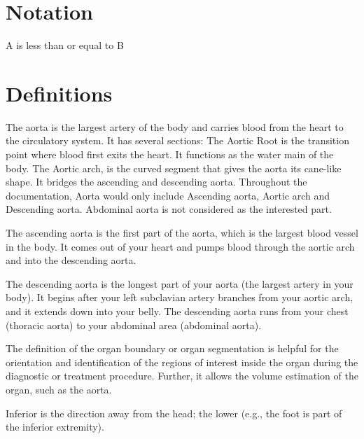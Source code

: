
\section*{Notation}
\begin{description}[font=\rmfamily\bfseries, leftmargin=3cm, style=nextline]
	\item[$A \leq B$] A is less than or equal to B
\end{description}

\section*{Definitions}
\begin{description}[font=\rmfamily\bfseries, leftmargin=3cm, style=nextline]
	\item[Aorta] The aorta is the largest artery of the body and carries blood from the heart to the circulatory system. It has several sections: The Aortic Root is the transition point where blood first exits the heart. It functions as the water main of the body. The Aortic arch, is the curved segment that gives the aorta its cane-like shape. It bridges the ascending and descending aorta. Throughout the documentation, Aorta would only include Ascending aorta, Aortic arch and Descending aorta. Abdominal aorta is not considered as the interested part.
	\item[Ascending Aorta] The ascending aorta is the first part of the aorta, which is the largest blood vessel in the body. It comes out of your heart and pumps blood through the aortic arch and into the descending aorta.
	\item[Descending Aorta] The descending aorta is the longest part of your aorta (the largest artery in your body). It begins after your left subclavian artery branches from your aortic arch, and it extends down into your belly. The descending aorta runs from your chest (thoracic aorta) to your abdominal area (abdominal aorta).
	\item[Organ Segmentation] The definition of the organ boundary or organ segmentation is helpful for the orientation and identification of the regions of interest inside the organ during the diagnostic or treatment procedure. Further, it allows the volume estimation of the organ, such as the aorta.
	\item[Inferior] Inferior is the direction away from the head; the lower (e.g., the foot is part of the inferior extremity).

\end{description}
